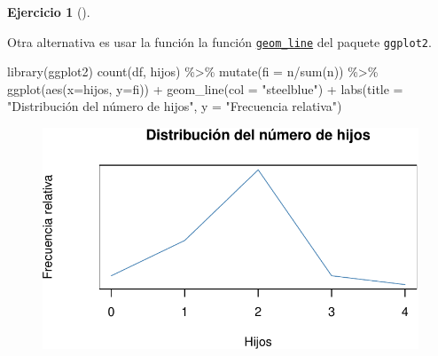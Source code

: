 \documentclass[
  a4paper,
]{scrreport}
\newenvironment{Shaded}{\begin{snugshade}}{\end{snugshade}}
\newcommand{\AttributeTok}[1]{\textcolor[rgb]{0.40,0.45,0.13}{#1}}
\newcommand{\FunctionTok}[1]{\textcolor[rgb]{0.28,0.35,0.67}{#1}}
\newcommand{\NormalTok}[1]{\textcolor[rgb]{0.00,0.23,0.31}{#1}}
\newcommand{\SpecialCharTok}[1]{\textcolor[rgb]{0.37,0.37,0.37}{#1}}
\newcommand{\StringTok}[1]{\textcolor[rgb]{0.13,0.47,0.30}{#1}}
\theoremstyle{definition}
\newtheorem{exercise}{Ejercicio}[chapter]
\theoremstyle{remark}
\begin{document}
\begin{exercise}[]
\begin{tcolorbox}
\end{tcolorbox}

\begin{tcolorbox}[enhanced jigsaw, rightrule=.15mm, toptitle=1mm, colbacktitle=quarto-callout-tip-color!10!white, titlerule=0mm, colback=white, leftrule=.75mm, bottomtitle=1mm, colframe=quarto-callout-tip-color-frame, breakable, title=\textcolor{quarto-callout-tip-color}{\faLightbulb}\hspace{0.5em}{Solución 2}, arc=.35mm, coltitle=black, opacityback=0, bottomrule=.15mm, opacitybacktitle=0.6, left=2mm, toprule=.15mm]

Otra alternativa es usar la función la función
\href{https://aprendeconalf.es/manual-r/07-graficos.html\#diagramas-de-lineas}{\texttt{geom\_line}}
del paquete \texttt{ggplot2}.

\begin{Shaded}
\begin{Highlighting}[]
\FunctionTok{library}\NormalTok{(ggplot2)}
\FunctionTok{count}\NormalTok{(df, hijos) }\SpecialCharTok{\%\textgreater{}\%} 
    \FunctionTok{mutate}\NormalTok{(}\AttributeTok{fi =}\NormalTok{ n}\SpecialCharTok{/}\FunctionTok{sum}\NormalTok{(n)) }\SpecialCharTok{\%\textgreater{}\%}
    \FunctionTok{ggplot}\NormalTok{(}\FunctionTok{aes}\NormalTok{(}\AttributeTok{x=}\NormalTok{hijos, }\AttributeTok{y=}\NormalTok{fi)) }\SpecialCharTok{+}
    \FunctionTok{geom\_line}\NormalTok{(}\AttributeTok{col =} \StringTok{"steelblue"}\NormalTok{) }\SpecialCharTok{+}
    \FunctionTok{labs}\NormalTok{(}\AttributeTok{title =} \StringTok{"Distribución del número de hijos"}\NormalTok{, }\AttributeTok{y =} \StringTok{"Frecuencia relativa"}\NormalTok{)}
\end{Highlighting}
\end{Shaded}

\begin{figure}[H]

{\centering \includegraphics{./03-frecuencias-graficos_files/figure-pdf/unnamed-chunk-8-1.pdf}

}

\end{figure}

\end{tcolorbox}

\end{exercise}
\end{document}
